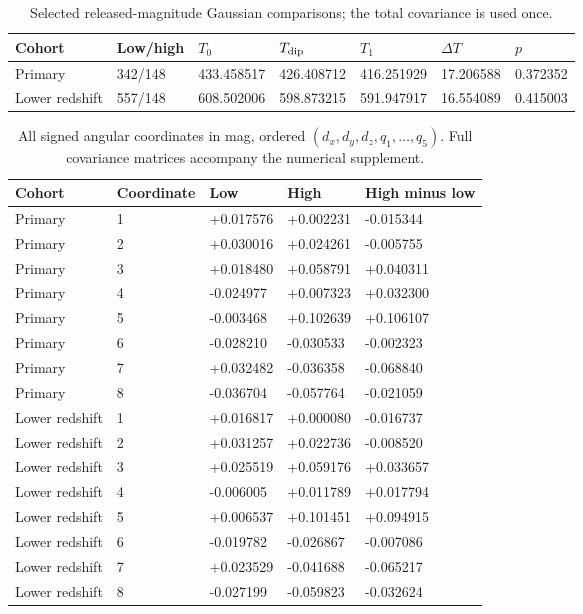 \begin{table}[htbp]
\centering\small
\caption{Selected released-magnitude Gaussian comparisons; the total covariance is used once.}\label{tab:snfit}
\begin{tabular}{lllllll}
\toprule
Cohort & Low/high & $T_0$ & $T_{\rm dip}$ & $T_1$ & $\Delta T$ & $p$ \\
\midrule
Primary & 342/148 & 433.458517 & 426.408712 & 416.251929 & 17.206588 & 0.372352 \\
Lower redshift & 557/148 & 608.502006 & 598.873215 & 591.947917 & 16.554089 & 0.415003 \\
\bottomrule
\end{tabular}
\end{table}

\begin{table}[htbp]
\centering\small
\caption{All signed angular coordinates in mag, ordered $(d_x,d_y,d_z,q_1,\ldots,q_5)$. Full covariance matrices accompany the numerical supplement.}\label{tab:signed}
\begin{tabular}{lllll}
\toprule
Cohort & Coordinate & Low & High & High minus low \\
\midrule
Primary & 1 & +0.017576 & +0.002231 & -0.015344 \\
Primary & 2 & +0.030016 & +0.024261 & -0.005755 \\
Primary & 3 & +0.018480 & +0.058791 & +0.040311 \\
Primary & 4 & -0.024977 & +0.007323 & +0.032300 \\
Primary & 5 & -0.003468 & +0.102639 & +0.106107 \\
Primary & 6 & -0.028210 & -0.030533 & -0.002323 \\
Primary & 7 & +0.032482 & -0.036358 & -0.068840 \\
Primary & 8 & -0.036704 & -0.057764 & -0.021059 \\
Lower redshift & 1 & +0.016817 & +0.000080 & -0.016737 \\
Lower redshift & 2 & +0.031257 & +0.022736 & -0.008520 \\
Lower redshift & 3 & +0.025519 & +0.059176 & +0.033657 \\
Lower redshift & 4 & -0.006005 & +0.011789 & +0.017794 \\
Lower redshift & 5 & +0.006537 & +0.101451 & +0.094915 \\
Lower redshift & 6 & -0.019782 & -0.026867 & -0.007086 \\
Lower redshift & 7 & +0.023529 & -0.041688 & -0.065217 \\
Lower redshift & 8 & -0.027199 & -0.059823 & -0.032624 \\
\bottomrule
\end{tabular}
\end{table}


